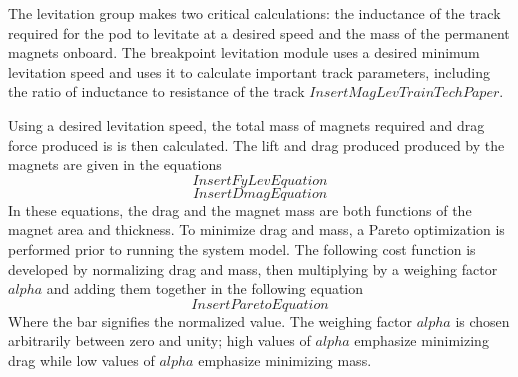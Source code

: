 	The levitation group makes two critical calculations: the inductance of the track required for the pod to levitate at a desired speed and the mass of the permanent magnets onboard. The breakpoint levitation module uses a desired minimum levitation speed and uses it to calculate important track parameters, including the ratio of inductance to resistance of the track $Insert MagLevTrain Tech Paper$.

	Using a desired levitation speed, the total mass of magnets required and drag force produced is is then calculated. The lift and drag produced produced by the magnets are given in the equations
	\begin{equation}
		\label{eq:fy_lev}
		Insert Fy Lev Equation
	\end{equation}
	\begin{equation}
		\label{eq:dmag}
		Insert Dmag Equation
	\end{equation}
	In these equations, the drag and the magnet mass are both functions of the magnet area and thickness. To minimize drag and mass, a Pareto optimization is performed prior to running the system model. The following cost function is developed by normalizing drag and mass, then multiplying by a weighing factor $alpha$ and adding them together in the following equation
	\begin{equation}
		\label{eq:pareto}
		Insert Pareto Equation
	\end{equation}
	Where the bar signifies the normalized value. The weighing factor $alpha$ is chosen arbitrarily between zero and unity; high values of $alpha$ emphasize minimizing drag while low values of $alpha$ emphasize minimizing mass.




